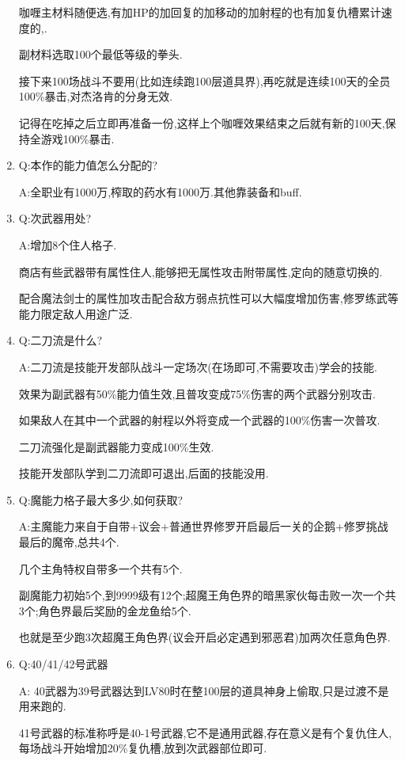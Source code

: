 \begin{enumerate}
	咖喱主材料随便选,有加HP的加回复的加移动的加射程的也有加复仇槽累计速度的,{\color{red}{也有开局自带异常状态的}}.

	副材料选取100个最低等级的拳头.

	接下来100场战斗不要用(比如连续跑100层道具界),再吃就是连续100天的全员100\%暴击,对杰洛肯的分身无效.

	记得在吃掉之后立即再准备一份,这样上个咖喱效果结束之后就有新的100天,保持全游戏100\%暴击.

	\item
	Q:本作的能力值怎么分配的?

	A:全职业有1000万,榨取的药水有1000万.其他靠装备和buff.

	\item
	Q:次武器用处?

	A:增加8个住人格子.

	商店有些武器带有属性住人,能够把无属性攻击附带属性,定向的随意切换的{\color{red}{精灵破}}.

	配合魔法剑士的属性加攻击配合敌方弱点抗性可以大幅度增加伤害,修罗练武等能力限定敌人用途广泛.

	\item
	Q:二刀流是什么?

	A:二刀流是技能开发部队战斗一定场次(在场即可,不需要攻击)学会的技能.

	效果为副武器有50\%能力值生效,且普攻变成75\%伤害的两个武器分别攻击.

	如果敌人在其中一个武器的射程以外将变成一个武器的100\%伤害一次普攻.

	二刀流强化是副武器能力变成100\%生效.

	技能开发部队学到二刀流即可退出,后面的技能没用.

	\item
	Q:魔能力格子最大多少,如何获取?

	A:主魔能力来自于自带+议会+普通世界修罗开启最后一关的企鹅+修罗挑战最后的魔帝,总共4个.

	几个主角特权自带多一个共有5个.
	
	副魔能力初始5个,到9999级有12个;超魔王角色界的暗黑家伙每击败一次一个共3个;角色界最后奖励的金龙鱼给5个.

	也就是至少跑3次超魔王角色界(议会开启必定遇到邪恶君)加两次任意角色界.

	\item
	Q:40/41/42号武器

	A:
	40武器为39号武器达到LV80时在整100层的道具神身上偷取,只是过渡不是用来跑的.

	41号武器的标准称呼是40-1号武器,它不是通用武器,存在意义是有个复仇住人,每场战斗开始增加20\%复仇槽,放到次武器部位即可.


\end{enumerate}
